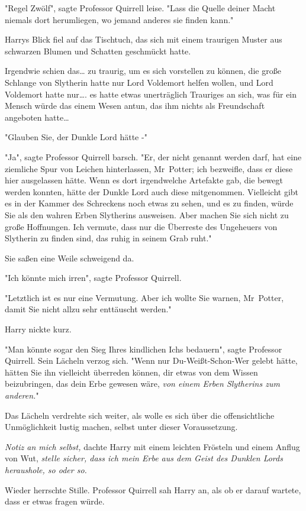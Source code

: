 {"Regel Zwölf", sagte Professor Quirrell leise. "Lass die Quelle deiner Macht niemals dort herumliegen, wo jemand anderes sie finden kann."

Harrys Blick fiel auf das Tischtuch, das sich mit einem traurigen Muster aus schwarzen Blumen und Schatten geschmückt hatte.

Irgendwie schien das… zu traurig, um es sich vorstellen zu können, die große Schlange von Slytherin hatte nur Lord Voldemort helfen wollen, und Lord Voldemort hatte nur…. es hatte etwas unerträglich Trauriges an sich, was für ein Mensch würde das einem Wesen antun, das ihm nichts als Freundschaft angeboten hatte…

"Glauben Sie, der Dunkle Lord hätte -"

"Ja", sagte Professor Quirrell barsch. "Er, der nicht genannt werden darf, hat eine ziemliche Spur von Leichen hinterlassen, Mr~Potter; ich bezweifle, dass er diese hier ausgelassen hätte. Wenn es dort irgendwelche Artefakte gab, die bewegt werden konnten, hätte der Dunkle Lord auch diese mitgenommen. Vielleicht gibt es in der Kammer des Schreckens noch etwas zu sehen, und es zu finden, würde Sie als den wahren Erben Slytherins ausweisen. Aber machen Sie sich nicht zu große Hoffnungen. Ich vermute, dass nur die Überreste des Ungeheuers von Slytherin zu finden sind, das ruhig in seinem Grab ruht."

Sie saßen eine Weile schweigend da.

"Ich könnte mich irren", sagte Professor Quirrell.

"Letztlich ist es nur eine Vermutung. Aber ich wollte Sie warnen, Mr~Potter, damit Sie nicht allzu sehr enttäuscht werden."

Harry nickte kurz.

"Man könnte sogar den Sieg Ihres kindlichen Ichs bedauern", sagte Professor Quirrell. Sein Lächeln verzog sich. "Wenn nur Du-Weißt-Schon-Wer gelebt hätte, hätten Sie ihn vielleicht überreden können, dir etwas von dem Wissen beizubringen, das dein Erbe gewesen wäre, \emph{von einem Erben Slytherins zum anderen.}"

Das Lächeln verdrehte sich weiter, als wolle es sich über die offensichtliche Unmöglichkeit lustig machen, selbst unter dieser Voraussetzung.

\emph{Notiz an mich selbst,} dachte Harry mit einem leichten Frösteln und einem Anflug von Wut, \emph{stelle sicher, dass ich mein Erbe aus dem Geist des Dunklen Lords heraushole, so oder so.}

Wieder herrschte Stille. Professor Quirrell sah Harry an, als ob er darauf wartete, dass er etwas fragen würde.

}
